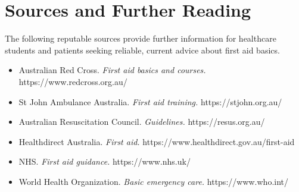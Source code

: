\section*{Sources and Further Reading}
The following reputable sources provide further information for healthcare students and patients seeking reliable, current advice about first aid basics.
\begin{itemize}
    \item Australian Red Cross. \textit{First aid basics and courses.} https://www.redcross.org.au/
    \item St John Ambulance Australia. \textit{First aid training.} https://stjohn.org.au/
    \item Australian Resuscitation Council. \textit{Guidelines.} https://resus.org.au/
    \item Healthdirect Australia. \textit{First aid.} https://www.healthdirect.gov.au/first-aid
    \item NHS. \textit{First aid guidance.} https://www.nhs.uk/
    \item World Health Organization. \textit{Basic emergency care.} https://www.who.int/
\end{itemize}
